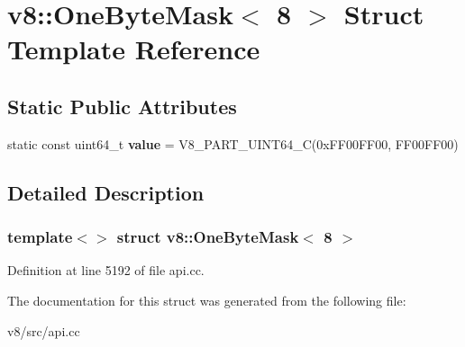 \hypertarget{structv8_1_1OneByteMask_3_018_01_4}{}\section{v8\+:\+:One\+Byte\+Mask$<$ 8 $>$ Struct Template Reference}
\label{structv8_1_1OneByteMask_3_018_01_4}
\subsection*{Static Public Attributes}
\begin{DoxyCompactItemize}
\item 
\mbox{\label{structv8_1_1OneByteMask_3_018_01_4_a83c02b01faa83dddabc00e630be15458}} 
static const uint64\+\_\+t {\bfseries value} = V8\+\_\+P\+A\+R\+T\+\_\+\+U\+I\+N\+T64\+\_\+C(0x\+F\+F00\+F\+F00, F\+F00\+F\+F00)
\end{DoxyCompactItemize}


\subsection{Detailed Description}
\subsubsection*{template$<$$>$\newline
struct v8\+::\+One\+Byte\+Mask$<$ 8 $>$}



Definition at line 5192 of file api.\+cc.



The documentation for this struct was generated from the following file\+:\begin{DoxyCompactItemize}
\item 
v8/src/api.\+cc\end{DoxyCompactItemize}
